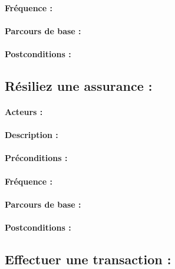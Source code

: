 \documentclass[../annexe.tex]{subfiles}
\begin{document}
\paragraph{Fréquence :}

\paragraph{Parcours de base :}

\paragraph{Postconditions :}

\newpage

\subsection{Résiliez une assurance :}

\paragraph{Acteurs :}

\paragraph{Description :}

\paragraph{Préconditions :}

\paragraph{Fréquence :}

\paragraph{Parcours de base :}

\paragraph{Postconditions :}

\newpage

\subsection{Effectuer une transaction :}
\end{document}
